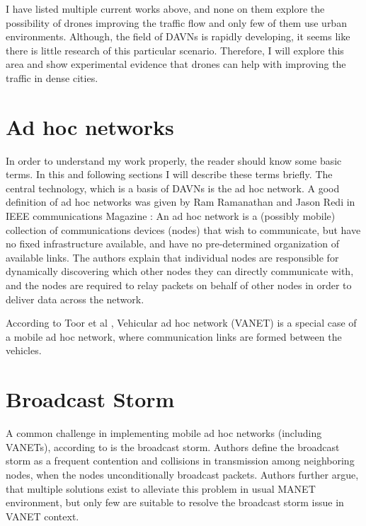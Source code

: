 \documentclass[]{nsm-thesis}
\begin{document}
I have listed multiple current works above, and none on them explore the possibility of drones improving the traffic flow and only few of them use urban environments. Although, the field of \acp{DAVN} is rapidly developing, it seems like there is little research of this particular scenario. Therefore, I will explore this area and show experimental evidence that drones can help with improving the traffic in dense cities.


\section{Ad hoc networks}

In order to understand my work properly, the reader should know some basic terms. In this and following sections I will describe these terms briefly. The central technology, which is a basis of \acp{DAVN} is the ad hoc network. A good definition of ad hoc networks was given by Ram Ramanathan and Jason Redi in IEEE communications Magazine \cite{ramanathan2002brief}: An ad hoc network is a (possibly mobile) collection of communications devices (nodes) that wish to communicate, but have no fixed infrastructure available, and have no pre-determined organization of available links. The authors explain that individual nodes are responsible for dynamically discovering which other nodes they can directly communicate with, and the nodes are required to relay packets on behalf of other nodes in order to deliver data across the network.

According to Toor et al \cite{toor2008}, Vehicular ad hoc network (\ac{VANET}) is a special case of a mobile ad hoc network, where communication links are formed between the vehicles.



\section{Broadcast Storm}

A common challenge in implementing mobile ad hoc networks (including \acp{VANET}), according to \textcite{wisitrophan2007} is the broadcast storm. Authors define the broadcast storm as a frequent contention and collisions in transmission among neighboring nodes, when the nodes unconditionally broadcast packets. Authors further argue, that multiple solutions exist to alleviate this problem in usual \ac{MANET} environment, but only few are suitable to resolve the broadcast storm issue in \ac{VANET} context.
\end{document}
